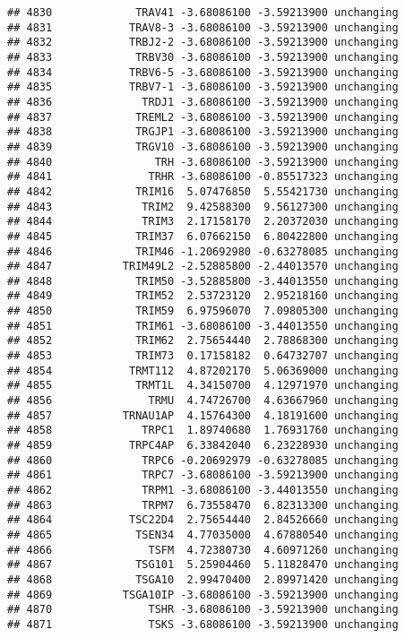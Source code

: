 \documentclass[]{article}
\begin{document}
\begin{verbatim}
## 4830             TRAV41 -3.68086100 -3.59213900 unchanging
## 4831            TRAV8-3 -3.68086100 -3.59213900 unchanging
## 4832            TRBJ2-2 -3.68086100 -3.59213900 unchanging
## 4833             TRBV30 -3.68086100 -3.59213900 unchanging
## 4834            TRBV6-5 -3.68086100 -3.59213900 unchanging
## 4835            TRBV7-1 -3.68086100 -3.59213900 unchanging
## 4836              TRDJ1 -3.68086100 -3.59213900 unchanging
## 4837             TREML2 -3.68086100 -3.59213900 unchanging
## 4838             TRGJP1 -3.68086100 -3.59213900 unchanging
## 4839             TRGV10 -3.68086100 -3.59213900 unchanging
## 4840                TRH -3.68086100 -3.59213900 unchanging
## 4841               TRHR -3.68086100 -0.85517323 unchanging
## 4842             TRIM16  5.07476850  5.55421730 unchanging
## 4843              TRIM2  9.42588300  9.56127300 unchanging
## 4844              TRIM3  2.17158170  2.20372030 unchanging
## 4845             TRIM37  6.07662150  6.80422800 unchanging
## 4846             TRIM46 -1.20692980 -0.63278085 unchanging
## 4847           TRIM49L2 -2.52885800 -2.44013570 unchanging
## 4848             TRIM50 -3.52885800 -3.44013550 unchanging
## 4849             TRIM52  2.53723120  2.95218160 unchanging
## 4850             TRIM59  6.97596070  7.09805300 unchanging
## 4851             TRIM61 -3.68086100 -3.44013550 unchanging
## 4852             TRIM62  2.75654440  2.78868300 unchanging
## 4853             TRIM73  0.17158182  0.64732707 unchanging
## 4854            TRMT112  4.87202170  5.06369000 unchanging
## 4855             TRMT1L  4.34150700  4.12971970 unchanging
## 4856               TRMU  4.74726700  4.63667960 unchanging
## 4857           TRNAU1AP  4.15764300  4.18191600 unchanging
## 4858              TRPC1  1.89740680  1.76931760 unchanging
## 4859            TRPC4AP  6.33842040  6.23228930 unchanging
## 4860              TRPC6 -0.20692979 -0.63278085 unchanging
## 4861              TRPC7 -3.68086100 -3.59213900 unchanging
## 4862              TRPM1 -3.68086100 -3.44013550 unchanging
## 4863              TRPM7  6.73558470  6.82313300 unchanging
## 4864            TSC22D4  2.75654440  2.84526660 unchanging
## 4865             TSEN34  4.77035000  4.67880540 unchanging
## 4866               TSFM  4.72380730  4.60971260 unchanging
## 4867             TSG101  5.25904460  5.11828470 unchanging
## 4868             TSGA10  2.99470400  2.89971420 unchanging
## 4869           TSGA10IP -3.68086100 -3.59213900 unchanging
## 4870               TSHR -3.68086100 -3.59213900 unchanging
## 4871               TSKS -3.68086100 -3.59213900 unchanging

\end{verbatim}
\end{document}
